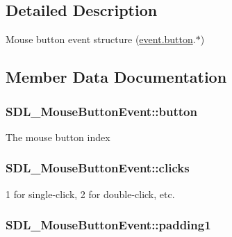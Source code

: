 \subsection{Detailed Description}
Mouse button event structure (\hyperlink{union_s_d_l___event_ab6da2fa2687e5f849f270adecc64785f}{event.\+button}.$\ast$) 

\subsection{Member Data Documentation}
\subsubsection[{\texorpdfstring{button}{button}}]{ S\+D\+L\+\_\+\+Mouse\+Button\+Event\+::button}\hypertarget{struct_s_d_l___mouse_button_event_a1a4680e19ae06d02d2093f0bcba1b24c}{}\label{struct_s_d_l___mouse_button_event_a1a4680e19ae06d02d2093f0bcba1b24c}
The mouse button index 
\subsubsection[{\texorpdfstring{clicks}{clicks}}]{ S\+D\+L\+\_\+\+Mouse\+Button\+Event\+::clicks}\hypertarget{struct_s_d_l___mouse_button_event_aa606bebcbc3ffc7e932016039c2a36a1}{}\label{struct_s_d_l___mouse_button_event_aa606bebcbc3ffc7e932016039c2a36a1}
1 for single-\/click, 2 for double-\/click, etc. 
\subsubsection[{\texorpdfstring{padding1}{padding1}}]{ S\+D\+L\+\_\+\+Mouse\+Button\+Event\+::padding1}\hypertarget{struct_s_d_l___mouse_button_event_a765957d218d16fa00558fa4d20e80689}{}\label{struct_s_d_l___mouse_button_event_a765957d218d16fa00558fa4d20e80689}
